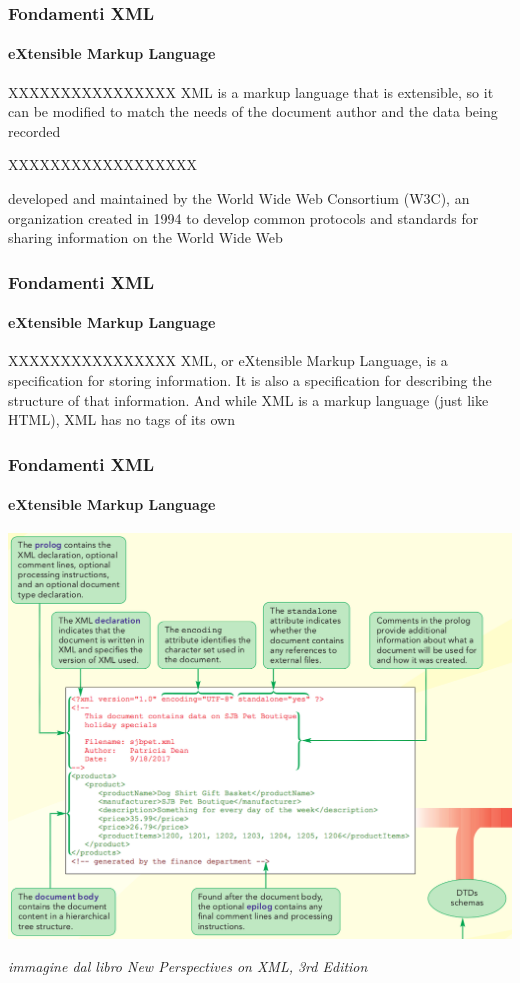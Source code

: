 \begin{frame}
	\frametitle{Fondamenti XML}
	\framesubtitle{eXtensible Markup Language}
	\addtocounter{nframe}{1}

	\begin{block}{XXXXXXXXXXXXXXXX}
		XML is a markup language that is extensible, so it can be m­odified
		to match the needs of the document author and the data being recorded
	\end{block}

	\begin{block} {XXXXXXXXXXXXXXXXXX}

		developed and maintained by the World Wide Web Consortium (W3C),
		an organization created in 1994 to develop common protocols and standards for
		sharing information on the World Wide Web

	\end{block}
\end{frame}

\begin{frame}
	\frametitle{Fondamenti XML}
	\framesubtitle{eXtensible Markup Language}
	\addtocounter{nframe}{1}

	\begin{block}{XXXXXXXXXXXXXXXX}
		XML, or eXtensible Markup Language, is a
		specification for storing information. It is also
		a specification for describing the structure of
		that information. And while XML is a markup
		language (just like HTML), XML has no tags
		of its own
	\end{block}

\end{frame}


\begin{frame}
	\frametitle{Fondamenti XML}
	\framesubtitle{eXtensible Markup Language}
	\addtocounter{nframe}{1}

	\begin{center}
		\includegraphics[width=.8\textwidth]{imgs/intro-doc-xml.png}
	\end{center}

	\begin{tiny}\textit{immagine dal libro New Perspectives on XML, 3rd Edition}\end{tiny}

\end{frame}


